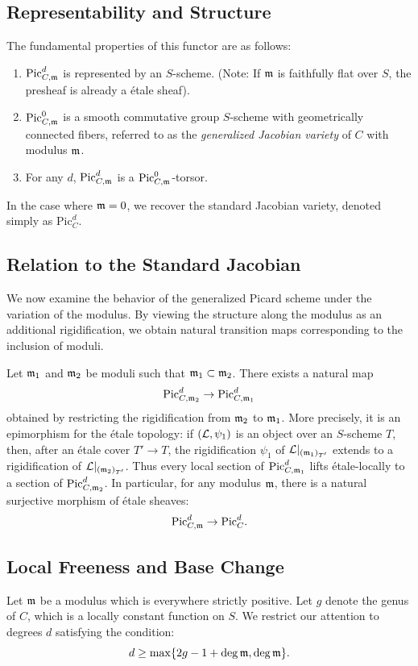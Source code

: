 \subsection*{Representability and Structure}
The fundamental properties of this functor are as follows:
\begin{enumerate}
    \item $\text{Pic}_{C, \mathfrak{m}}^{d}$ is represented by an $S$-scheme. (Note: If $\mathfrak{m}$ is faithfully flat over $S$, the presheaf is already a \'etale sheaf).
    \item $\text{Pic}_{C, \mathfrak{m}}^{0}$ is a smooth commutative group $S$-scheme with geometrically connected fibers, referred to as the \textit{generalized Jacobian variety} of $C$ with modulus $\mathfrak{m}$.
    \item For any $d$, $\text{Pic}_{C, \mathfrak{m}}^{d}$ is a $\text{Pic}_{C, \mathfrak{m}}^{0}$-torsor.
\end{enumerate}
In the case where $\mathfrak{m} = 0$, we recover the standard Jacobian variety, denoted simply as $\text{Pic}_C^d$.
\subsection*{Relation to the Standard Jacobian}
We now examine the behavior of the generalized Picard scheme under the variation of the modulus. By viewing the structure along the modulus as an additional rigidification, we obtain natural transition maps corresponding to the inclusion of moduli.

Let $\mathfrak{m}_1$ and $\mathfrak{m}_2$ be moduli such that $\mathfrak{m}_1 \subset \mathfrak{m}_2$. There exists a natural map 
\[
\text{Pic}_{C, \mathfrak{m}_2}^d \to \text{Pic}_{C, \mathfrak{m}_1}^d
\]
obtained by restricting the rigidification from $\mathfrak{m}_2$ to $\mathfrak{m}_1$.
More precisely, it is an epimorphism for the \'etale topology: if
$(\mathcal{L},\psi_1)$ is an object over an $S$-scheme $T$, then, after an \'etale
cover $T'\to T$, the rigidification $\psi_1$ of
$\mathcal{L}|_{(\mathfrak{m}_1)_{T'}}$ extends to a rigidification of
$\mathcal{L}|_{(\mathfrak{m}_2)_{T'}}$. Thus every local section of
$\text{Pic}_{C,\mathfrak{m}_1}^d$ lifts \'etale-locally to a section of
$\text{Pic}_{C,\mathfrak{m}_2}^d$.
In particular, for any modulus $\mathfrak{m}$, there is a natural surjective morphism of \'etale sheaves:
\[
\text{Pic}_{C, \mathfrak{m}}^d \to \text{Pic}_C^d.
\]


\subsection*{Local Freeness and Base Change}
Let $\mathfrak{m}$ be a modulus which is everywhere strictly positive. Let $g$ denote the genus of $C$, which is a locally constant function on $S$. We restrict our attention to degrees $d$ satisfying the condition:
\begin{equation} \label{equation:degree-condition}
    d \geq \max\{2g - 1 + \deg \mathfrak{m}, \deg \mathfrak{m}\}.
\end{equation}

